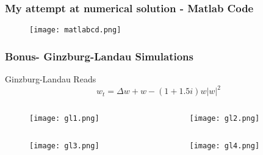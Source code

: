 \documentclass[]{beamer}
\begin{document}
\begin{frame}[fragile]
    \frametitle{My attempt at numerical solution - Matlab Code}
    \begin{figure}
        \centering
        \texttt{[image: matlabcd.png]}
    \end{figure}
\end{frame}

\begin{frame}
    \frametitle{Bonus- Ginzburg-Landau Simulations }
    Ginzburg-Landau Reads
    \[w_t = \Delta w + w -(1+1.5i)w|w|^2\]
    \begin{columns}[c]
    \begin{column}{.5\textwidth}
        \begin{figure}
        \centering
        \texttt{[image: gl1.png]}
        \end{figure}
    \end{column}
    \begin{column}{.5\textwidth}
        \begin{figure}
        \centering
        \texttt{[image: gl2.png]}
        \end{figure}
    \end{column}
    \end{columns}
        \begin{columns}[c]
    \begin{column}{.5\textwidth}
        \begin{figure}
        \centering
        \texttt{[image: gl3.png]}
        \end{figure}
    \end{column}
    \begin{column}{.5\textwidth}
        \begin{figure}
        \centering
        \texttt{[image: gl4.png]}
        \end{figure}
    \end{column}
    \end{columns}
\end{frame}
\end{document}
